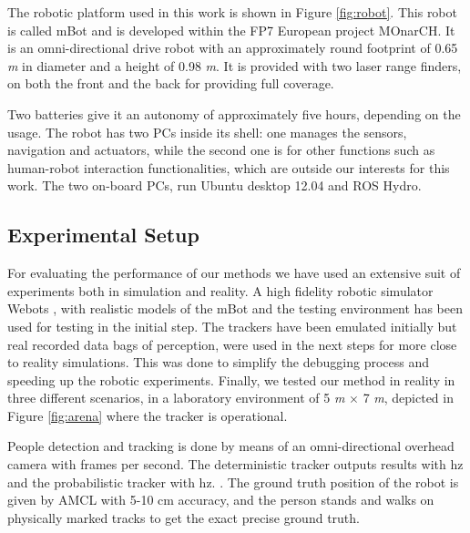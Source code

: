 The robotic platform used in this work is shown in Figure \ref{fig:robot}. This robot is called mBot \cite{Messias2014robotic} and is developed within the FP7 European project MOnarCH.
It is an omni-directional drive robot with an approximately round footprint of 0.65 \textit{m} in diameter and a height of 0.98 \textit{m}.
It is provided with two laser range finders, on both the front and the back for providing full coverage.

Two batteries give it an autonomy of approximately five hours, depending on the usage.
The robot has two PCs inside its shell: one manages the sensors, navigation and actuators, while the second one is for other functions such as human-robot interaction functionalities, which are outside our interests for this work. The two on-board PCs, run Ubuntu desktop 12.04 and ROS Hydro. 


\subsection{Experimental Setup}
\label{sec:Experimental_setup}


For evaluating the performance of our methods we have used an extensive suit of experiments both in simulation and reality. A high fidelity robotic simulator Webots \cite{michel1998webots}, with realistic models of the mBot and the testing environment has been used for testing in the initial step. The trackers have been emulated initially but real recorded data bags of perception, were used in the next steps for more close to reality simulations. This was done to simplify the debugging process and speeding up the robotic experiments. %
Finally, we tested our method in reality in three different scenarios, in a laboratory environment of 5 \textit{m} $\times$ 7 \textit{m}, depicted in Figure \ref{fig:arena} where the tracker is operational.
 


People detection and tracking is done by means of an omni-directional overhead camera  with  frames per second. The deterministic tracker outputs results with   hz and the probabilistic tracker with   hz.  . The ground truth position of the robot is given by AMCL with 5-10 cm accuracy, and the person stands and walks on physically marked tracks to get the exact precise ground truth.


